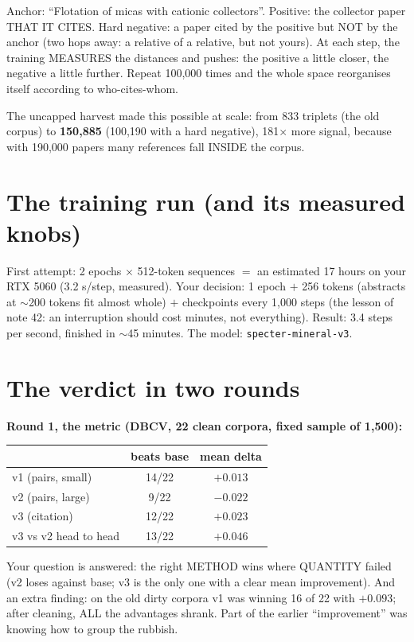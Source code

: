 \documentclass[11pt,a4paper]{article}
\begin{document}
Anchor: ``Flotation of micas with cationic collectors''. Positive: the collector paper THAT IT
CITES. Hard negative: a paper cited by the positive but NOT by the anchor (two hops away: a
relative of a relative, but not yours). At each step, the training MEASURES the distances and
pushes: the positive a little closer, the negative a little further. Repeat 100,000 times and
the whole space reorganises itself according to who-cites-whom.

The uncapped harvest made this possible at scale: from 833 triplets (the old corpus) to
\textbf{150,885} (100,190 with a hard negative), 181$\times$ more signal, because with 190,000
papers many references fall INSIDE the corpus.

\section{The training run (and its measured knobs)}

First attempt: 2 epochs $\times$ 512-token sequences $=$ an estimated 17 hours on your RTX 5060
(3.2 s/step, measured). Your decision: 1 epoch $+$ 256 tokens (abstracts at $\sim$200 tokens fit
almost whole) $+$ checkpoints every 1,000 steps (the lesson of note 42: an interruption should
cost minutes, not everything). Result: 3.4 steps per second, finished in $\sim$45 minutes. The
model: \texttt{specter-mineral-v3}.

\section{The verdict in two rounds}

\textbf{Round 1, the metric (DBCV, 22 clean corpora, fixed sample of 1,500):}

\begin{center}
\begin{tabular}{lcc}
 & beats base & mean delta \\
\hline
v1 (pairs, small)   & 14/22 & $+0.013$ \\
v2 (pairs, large)   & 9/22  & $-0.022$ \\
v3 (citation)       & 12/22 & $\mathbf{+0.023}$ \\
v3 vs v2 head to head & 13/22 & $+0.046$ \\
\end{tabular}
\end{center}

Your question is answered: the right METHOD wins where QUANTITY failed (v2 loses against base;
v3 is the only one with a clear mean improvement). And an extra finding: on the old dirty
corpora v1 was winning 16 of 22 with $+0.093$; after cleaning, ALL the advantages shrank. Part
of the earlier ``improvement'' was knowing how to group the rubbish.
\end{document}
